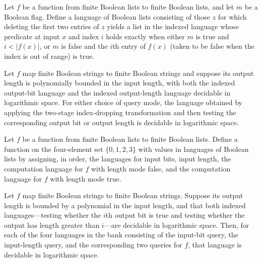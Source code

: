 \begin{definition}
\label{Complexity.compLift}
\leanok
{}
Let $f$ be a function from finite Boolean lists to finite Boolean lists, and let $m$ be
a Boolean flag. Define a language of Boolean lists consisting of those $z$ for which
deleting the first two entries of $z$ yields a list in the indexed language whose
predicate at input $x$ and index $i$ holds exactly when either $m$ is true and
$i<|f(x)|$, or $m$ is false and the $i$th entry of $f(x)$ (taken to be false when the
index is out of range) is true.
\end{definition}

\begin{lemma}
\label{Complexity.compLift_mem}
\leanok
{}
Let $f$ map finite Boolean strings to finite Boolean strings and suppose its output
length is polynomially bounded in the input length, with both the indexed output-bit
language and the indexed output-length language decidable in logarithmic space. For
either choice of query mode, the language obtained by applying the two-stage
index-dropping transformation and then testing the corresponding output bit or output
length is decidable in logarithmic space.
\end{lemma}

\begin{definition}
\label{Complexity.compBank}
\leanok
{}
Let $f$ be a function from finite Boolean lists to finite Boolean lists. Define a
function on the four-element set $\{0,1,2,3\}$ with values in languages of Boolean lists
by assigning, in order, the languages for input bits, input length, the computation
language for $f$ with length mode false, and the computation language for $f$ with
length mode true.
\end{definition}

\begin{lemma}
\label{Complexity.compBank_mem}
\leanok
{}
Let $f$ map finite Boolean strings to finite Boolean strings. Suppose its output length
is bounded by a polynomial in the input length, and that both indexed languages—testing
whether the $i$th output bit is true and testing whether the output has length greater
than $i$—are decidable in logarithmic space. Then, for each of the four languages in the
bank consisting of the input-bit query, the input-length query, and the corresponding
two queries for $f$, that language is decidable in logarithmic space.
\end{lemma}

